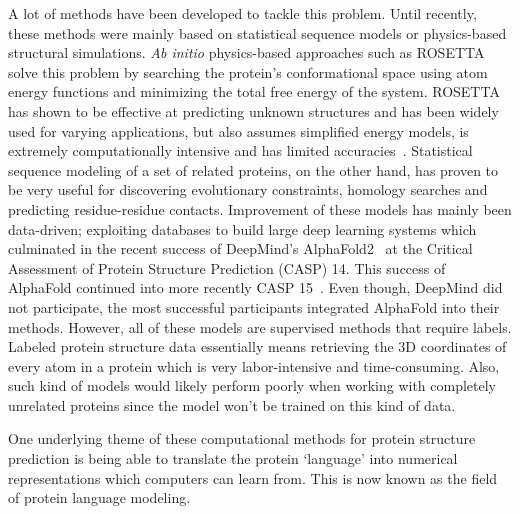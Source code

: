 A lot of methods have been developed to tackle this problem. Until recently, these methods were mainly based on statistical sequence models or physics-based structural simulations. \textit{Ab initio} physics-based approaches such as ROSETTA~\cite{rosetta} solve this problem by searching the protein's conformational space using atom energy functions and minimizing the total free energy of the system. ROSETTA has shown to be effective at predicting unknown structures and has been widely used for varying applications, but also assumes simplified energy models, is extremely computationally intensive and has limited accuracies~\cite{review}. Statistical sequence modeling of a set of related proteins, on the other hand, has proven to be very useful for discovering evolutionary constraints, homology searches and predicting residue-residue contacts. Improvement of these models has mainly been data-driven; exploiting databases to build large deep learning systems which culminated in the recent success of DeepMind's AlphaFold2~\cite{alphafold2} at the Critical Assessment of Protein Structure Prediction (CASP) 14. This success of AlphaFold continued into more recently CASP 15~\cite{casp15}. Even though, DeepMind did not participate, the most successful participants integrated AlphaFold into their methods. However, all of these models are supervised methods that require labels. Labeled protein structure data essentially means retrieving the 3D coordinates of every atom in a protein which is very labor-intensive and time-consuming. Also, such kind of models would likely perform poorly when working with completely unrelated proteins since the model won't be trained on this kind of data. 

One underlying theme of these computational methods for protein structure prediction is being able to translate the protein `language' into numerical representations which computers can learn from. This is now known as the field of protein language modeling.

